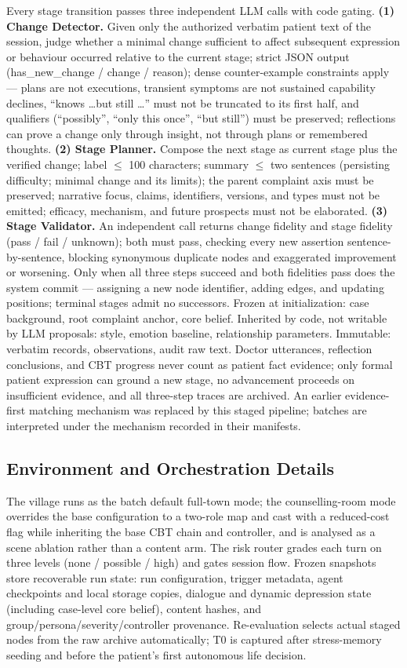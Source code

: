 \documentclass[10pt]{article}
\begin{document}
Every stage transition passes three independent LLM calls with code gating.
\textbf{(1) Change Detector.} Given only the authorized verbatim patient text of the session, judge whether a minimal change sufficient to affect subsequent expression or behaviour occurred relative to the current stage; strict JSON output (has\_new\_change / change / reason); dense counter-example constraints apply --- plans are not executions, transient symptoms are not sustained capability declines, ``knows \ldots but still \ldots'' must not be truncated to its first half, and qualifiers (``possibly'', ``only this once'', ``but still'') must be preserved; reflections can prove a change only through insight, not through plans or remembered thoughts.
\textbf{(2) Stage Planner.} Compose the next stage as current stage plus the verified change; label $\le$ 100 characters; summary $\le$ two sentences (persisting difficulty; minimal change and its limits); the parent complaint axis must be preserved; narrative focus, claims, identifiers, versions, and types must not be emitted; efficacy, mechanism, and future prospects must not be elaborated.
\textbf{(3) Stage Validator.} An independent call returns change fidelity and stage fidelity (pass / fail / unknown); both must pass, checking every new assertion sentence-by-sentence, blocking synonymous duplicate nodes and exaggerated improvement or worsening.
Only when all three steps succeed and both fidelities pass does the system commit --- assigning a new node identifier, adding edges, and updating positions; terminal stages admit no successors.
Frozen at initialization: case background, root complaint anchor, core belief.
Inherited by code, not writable by LLM proposals: style, emotion baseline, relationship parameters.
Immutable: verbatim records, observations, audit raw text.
Doctor utterances, reflection conclusions, and CBT progress never count as patient fact evidence; only formal patient expression can ground a new stage, no advancement proceeds on insufficient evidence, and all three-step traces are archived.
An earlier evidence-first matching mechanism was replaced by this staged pipeline; batches are interpreted under the mechanism recorded in their manifests.

\subsection{Environment and Orchestration Details}

The village runs as the batch default full-town mode; the counselling-room mode overrides the base configuration to a two-role map and cast with a reduced-cost flag while inheriting the base CBT chain and controller, and is analysed as a scene ablation rather than a content arm.
The risk router grades each turn on three levels (none / possible / high) and gates session flow.
Frozen snapshots store recoverable run state: run configuration, trigger metadata, agent checkpoints and local storage copies, dialogue and dynamic depression state (including case-level core belief), content hashes, and group/persona/severity/controller provenance.
Re-evaluation selects actual staged nodes from the raw archive automatically; T0 is captured after stress-memory seeding and before the patient's first autonomous life decision.
\end{document}
